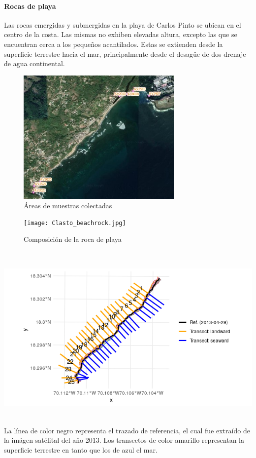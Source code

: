 \documentclass[11pt,]{article}
\begin{document}
\paragraph{Rocas de playa}\label{rocas-de-playa}

Las rocas emergidas y submergidas en la playa de Carlos Pinto se ubican
en el centro de la costa. Las mismas no exhiben elevadas altura, excepto
las que se encuentran cerca a los pequeños acantilados. Estas se
extienden desde la superficie terrestre hacia el mar, principalmente
desde el desagüe de dos drenaje de agua continental.

\begin{figure}
\centering
\includegraphics[height=2.60417in]{areas_muestras_colectadas.jpg}
\caption{Áreas de muestras colectadas\label{muestras}}
\end{figure}

\begin{figure}
\centering
\texttt{[image: Clasto\_beachrock.jpg]}
\caption{Composición de la roca de playa\label{clasto}}
\end{figure}

\includegraphics[height=3.64583in]{transect_linea_R.png} La línea de
color negro representa el trazado de referencia, el cual fue extraído de
la imágen satélital del año 2013. Los transectos de color amarillo
representan la superficie terrestre en tanto que los de azul el mar.
\end{document}
